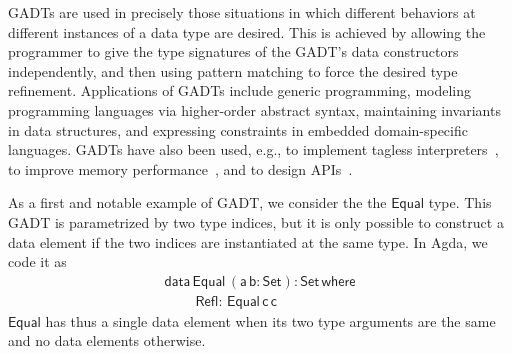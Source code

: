 \documentclass[acmsmall,screen,review,anonymous]{acmart}
\theoremstyle{definition}
\begin{document}
GADTs are used in precisely those situations in which different
behaviors at different instances of a data type are desired. This is
achieved by allowing the programmer to give the type signatures of the
GADT's data constructors independently, and then using pattern
matching to force the desired type refinement. Applications of GADTs
include generic programming, modeling programming languages via
higher-order abstract syntax, maintaining invariants in data
structures, and expressing constraints in embedded domain-specific
languages. GADTs have also been used, e.g., to implement tagless
interpreters~\cite{pl04,pr06,pvww06}, to improve memory
performance~\cite{min15}, and to design APIs~\cite{pen20}.




As a first and notable example of GADT, we consider the the $\mathsf{Equal}$ type.
This GADT is parametrized by two type indices,
but it is only possible to construct a data element if the two indices are instantiated at the same type.
In Agda, we code it as
\begin{equation}\label{eq:eq}
\begin{array}{l}
\mathsf{data\, Equal\,(a\,b : Set) : Set\,where}\\
\mathsf{\;\;\;\;\;\;\;\;Refl :\, Equal\,c\,c}
\end{array}
\end{equation}
$\mathsf{Equal}$ has thus a single data element when its two type arguments
are the same and no data elements otherwise.
\end{document}
